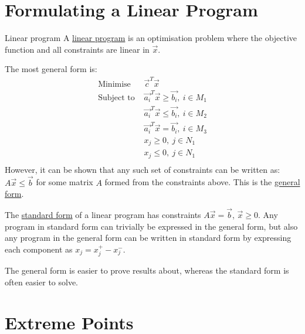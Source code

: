 \documentclass[../Main.tex]{subfiles}
\begin{document}
\section{Formulating a Linear Program}
\begin{definition}{Linear program}
    A \underline{linear program} is an optimisation problem where the objective function and all constraints are linear in $\vec{x}$.
\end{definition}
The most general form is:
\begin{align*}
    \text{Minimise } &\vec{c}^T\vec{x} \\
    \text{Subject to } &\vec{a_i}^T \vec{x} \geq \vec{b_i},~i \in M_1 \\
    &\vec{a_i}^T \vec{x}\leq \vec{b_i},~i \in M_2 \\
    &\vec{a_i}^T \vec{x}= \vec{b_i},~i \in M_3 \\
    &x_j \geq 0,~j \in N_1 \\
    &x_j \leq 0,~j \in N_1 \\
\end{align*}
However, it can be shown that any such set of constraints can be written as: $A\vec{x} \leq \vec{b}$ for some matrix $A$ formed from the constraints above. This is the \underline{general form}.

The \underline{standard form} of a linear program has constraints $A\vec{x} = \vec{b}$, $\vec{x} \geq 0$. Any program in standard form can trivially be expressed in the general form, but also any program in the general form can be written in standard form by expressing each component as $x_j = x_j^+ - x_j^-$.

The general form is easier to prove results about, whereas the standard form is often easier to solve.
\section{Extreme Points}
\end{document}
